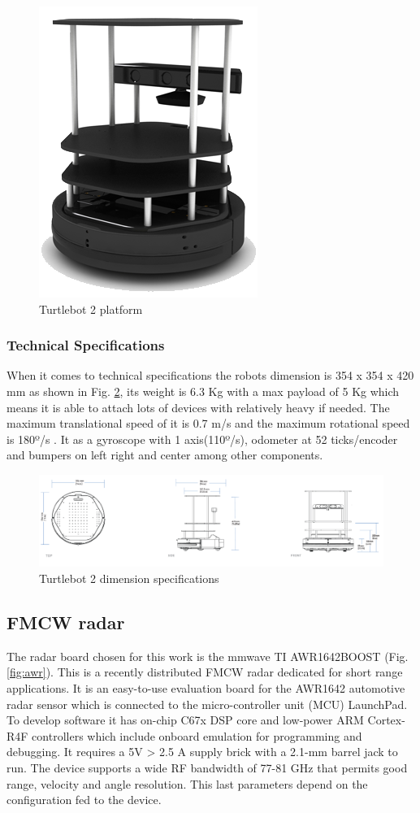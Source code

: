 \begin{figure}[ht!] 
\centerline{\includegraphics [width=0.3 \textwidth]{imgs/chapter4/turtlebot2.png}}
\caption{Turtlebot 2 platform}
\label{fig:t2}
\end{figure}

\subsubsection*{Technical Specifications}
When it comes to technical specifications the robots dimension is 354 x 354 x 420 mm as shown in Fig. \ref{fig::t2specs}, its weight is 6.3 Kg with a max payload of 5 Kg which means it is able to attach lots of devices with relatively heavy if needed. The maximum translational  speed of it is 0.7 m/s and the maximum rotational speed is 180º/s . It as a gyroscope with 1 axis(110º/s), odometer at 52 ticks/encoder and  bumpers on left right and center among other components. 

\begin{figure}[ht!] 
\centerline{\includegraphics [width=1.0 \textwidth]{imgs/chapter4/tspecs.png}}
\caption{Turtlebot 2 dimension specifications}
\label{fig::t2specs}
\end{figure}


\subsection{FMCW radar}
The radar board chosen for this work is the mmwave \ac{TI} AWR1642BOOST (Fig.\ref{fig:awr}). This is a recently distributed \ac{FMCW} radar dedicated for short range applications. It is an easy-to-use evaluation board for the AWR1642 automotive radar sensor which is connected to the micro-controller unit (MCU) LaunchPad. To develop software it has  on-chip C67x DSP core and low-power ARM Cortex-R4F controllers which include onboard emulation for programming and debugging.
It requires a 5V > 2.5 A supply brick with a 2.1-mm barrel jack to run.
The device supports a wide RF bandwidth of 77-81 GHz that permits good range, velocity  and angle resolution. This last parameters depend on the configuration fed to the device.

